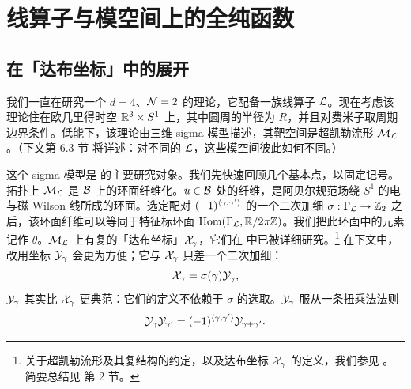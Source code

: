 
\section{线算子与模空间上的全纯函数}
\label{sec:linehol}

\subsection{在「达布坐标」中的展开}

我们一直在研究一个 $d=4$、$\mathcal{N}=2$ 的理论，它配备一族线算子 $\mathcal{L}$。现在考虑该理论住在欧几里得时空 $\mathbb{R}^3\times S^1$ 上，其中圆周的半径为 $R$，并且对费米子取周期边界条件。低能下，该理论由三维 sigma 模型描述，其靶空间是超凯勒流形 $\mathcal{M}_{\mathcal{L}}$。（下文第 6.3 节%
将详述：对不同的 $\mathcal{L}$，这些模空间彼此如何不同。）

这个 sigma 模型是 \cite{Gaiotto:2008cd} 的主要研究对象。我们先快速回顾几个基本点，以固定记号。拓扑上 $\mathcal{M}_{\mathcal{L}}$ 是 $\mathcal{B}$ 上的环面纤维化。$u\in\mathcal{B}$ 处的纤维，是阿贝尔规范场绕 $S^1$ 的电与磁 Wilson 线所成的环面。选定配对 $(-1)^{\langle \gamma,\gamma' \rangle}$ 的一个二次加细 $\sigma:\Gamma_{\mathcal{L}}\to\mathbb{Z}_2$ 之后，该环面纤维可以等同于特征标环面 $\operatorname{Hom}(\Gamma_{\mathcal{L}},\mathbb{R}/2\pi\mathbb{Z})$。我们把此环面中的元素记作 $\theta$。$\mathcal{M}_{\mathcal{L}}$ 上有复的「达布坐标」$\mathcal{X}_\gamma$，它们在 \cite{Gaiotto:2008cd,Gaiotto:2009hg} 中已被详细研究。\footnote{关于超凯勒流形及其复结构的约定，以及达布坐标 $\mathcal{X}_\gamma$ 的定义，我们参见 \cite{Gaiotto:2008cd}。简要总结见 \cite{Gaiotto:2009hg} 第 2 节。}
在下文中，改用坐标 $\mathcal{Y}_\gamma$ 会更为方便；它与 $\mathcal{X}_\gamma$ 只差一个二次加细：
\begin{equation}\label{eq:Ygam-Xgam}
\mathcal{X}_\gamma = \sigma(\gamma) \mathcal{Y}_\gamma,
\end{equation}
$\mathcal{Y}_\gamma$ 其实比 $\mathcal{X}_\gamma$ 更典范：它们的定义不依赖于 $\sigma$ 的选取。$\mathcal{Y}_\gamma$ 服从一条扭乘法法则
\begin{equation}\label{eq:Y-twisted}
 \mathcal{Y}_\gamma \mathcal{Y}_{\gamma'} = (-1)^{\langle \gamma,\gamma' \rangle} \mathcal{Y}_{\gamma+\gamma'}.
\end{equation}

